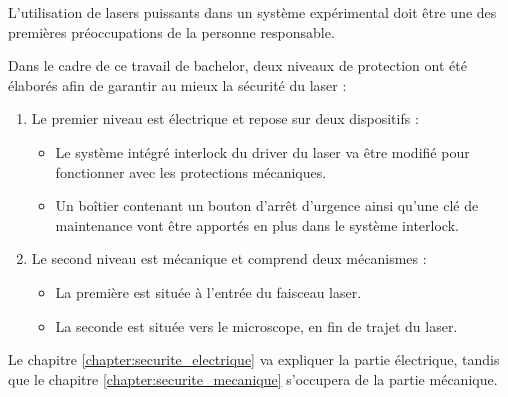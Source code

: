 L'utilisation de lasers puissants dans un système expérimental doit être une des premières préoccupations de la personne responsable.

Dans le cadre de ce travail de bachelor, deux niveaux de protection ont été élaborés afin de garantir au mieux la sécurité du laser :

\begin{enumerate}
    \item Le premier niveau est électrique et repose sur deux dispositifs :
          \begin{itemize}
              \item Le système intégré interlock du driver du laser va être modifié pour fonctionner avec les protections mécaniques.
              \item Un boîtier contenant un bouton d'arrêt d'urgence ainsi qu'une clé de maintenance vont être apportés en plus dans le système interlock.
          \end{itemize}
    \item Le second niveau est mécanique et comprend deux mécanismes :
          \begin{itemize}
              \item La première est située à l'entrée du faisceau laser.
              \item La seconde est située vers le microscope, en fin de trajet du laser.
          \end{itemize}
\end{enumerate}

Le chapitre \ref{chapter:securite_electrique} va expliquer la partie électrique, tandis que le chapitre \ref{chapter:securite_mecanique} s'occupera de la partie mécanique.